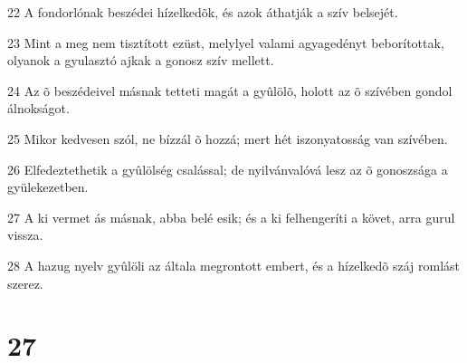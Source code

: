 \par 22 A fondorlónak beszédei hízelkedõk, és azok áthatják a szív belsejét.
\par 23 Mint a meg nem tisztított ezüst, melylyel valami agyagedényt beborítottak, olyanok a gyulasztó ajkak a gonosz szív mellett.
\par 24 Az õ beszédeivel másnak tetteti magát a gyûlölõ, holott az õ szívében gondol álnokságot.
\par 25 Mikor kedvesen szól, ne bízzál õ hozzá; mert hét iszonyatosság van szívében.
\par 26 Elfedeztethetik a gyûlölség csalással; de nyilvánvalóvá lesz az õ gonoszsága a gyülekezetben.
\par 27 A ki vermet ás másnak, abba belé esik; és a ki felhengeríti a követ, arra gurul vissza.
\par 28 A hazug nyelv gyûlöli az általa megrontott embert, és a hízelkedõ száj romlást szerez.

\chapter{27}

